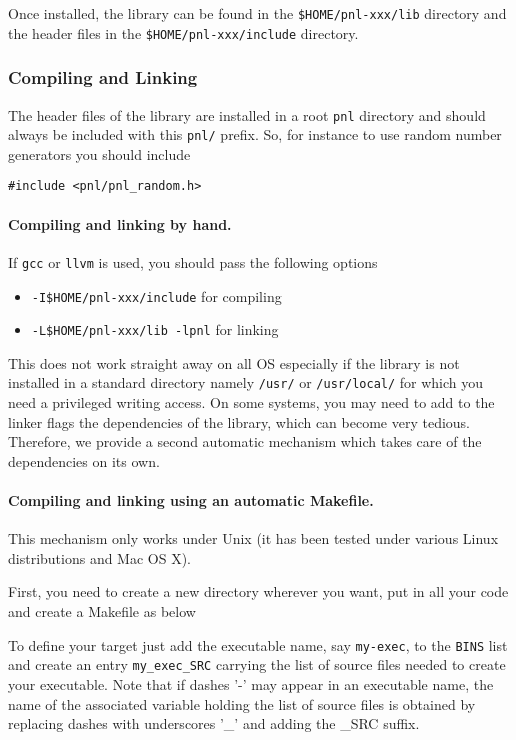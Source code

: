 \documentclass[a4paper,11pt,twoside]{article}
\begin{document}
Once installed, the library can be found in the
\verb!$HOME/pnl-xxx/lib!  directory and the header files in the
\verb!$HOME/pnl-xxx/include! directory. 

\subsubsection{Compiling and Linking}

The header files of the library are installed in a root \verb!pnl! directory and
should always be included with this \verb!pnl/! prefix. So, for instance to use
random number generators you should include 
\begin{verbatim}
#include <pnl/pnl_random.h>
\end{verbatim}

\paragraph{Compiling and linking by hand.}

If \verb!gcc! or \verb!llvm! is used, you should pass the following options
\begin{itemize}
\item \verb!-I$HOME/pnl-xxx/include! for compiling
\item \verb!-L$HOME/pnl-xxx/lib -lpnl! for linking
\end{itemize}
This does not work straight away on all OS especially if the library is not
installed in a standard directory namely \verb+/usr/+ or \verb+/usr/local/+ for
which you need a privileged writing access.
On some systems, you may need to add to the linker flags the dependencies of the
library, which can become very tedious. Therefore, we provide a second automatic
mechanism which takes care of the dependencies on its own.

\paragraph{Compiling and linking using an automatic Makefile.}

This mechanism only works under Unix (it has been tested under various Linux
distributions and Mac OS X).

First, you need to create a new directory wherever you want, put in all your
code and create a Makefile as below

To define your target just add the executable name, say \verb!my-exec!, to the
\verb!BINS!  list and create an entry \verb!my_exec_SRC! carrying the list
of source files needed to create your executable.  Note that if dashes '-' may
appear in an executable name, the name of the associated variable holding the
list of source files is obtained by replacing dashes with underscores '_' and
adding the _SRC suffix.
\end{document}
